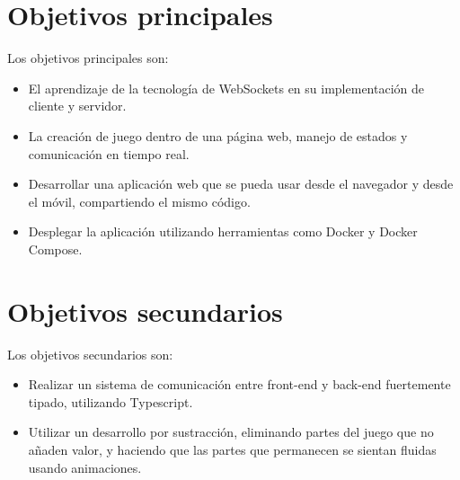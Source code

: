 \section{Objetivos principales}

Los objetivos principales son:

\begin{itemize}
	\item El aprendizaje de la tecnología de WebSockets en su implementación de cliente y servidor.
	\item La creación de juego dentro de una página web, manejo de estados y comunicación en tiempo real.
	\item Desarrollar una aplicación web que se pueda usar desde el navegador y desde el móvil, compartiendo el mismo código.
	\item Desplegar la aplicación utilizando herramientas como Docker y Docker Compose.
\end{itemize}


\section{Objetivos secundarios}

Los objetivos secundarios son:

\begin{itemize}
	\item Realizar un sistema de comunicación entre front-end y back-end fuertemente tipado, utilizando Typescript.
	\item Utilizar un desarrollo por sustracción, eliminando partes del juego que no añaden valor, y haciendo que las partes que permanecen se sientan fluidas usando animaciones.
\end{itemize}
